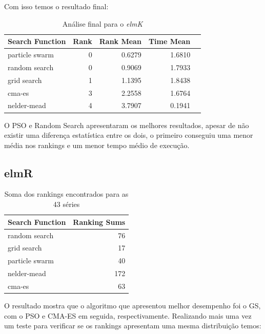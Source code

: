 \documentclass[preprint,12pt]{elsarticle}
\begin{document}
Com isso temos o resultado final:


\begin{table}[h]
	\centering
	\begin{tabular}{lrrrr}
		\hline
		Search Function   &   Rank &   Rank Mean &      Time Mean \\
		\hline
		particle swarm    &      0 &    0.6279 &       1.6810  \\
		random search     &      0 &    0.9069 &       1.7933  \\
		grid search       &      1 &    1.1395  &       1.8438  \\
		cma-es            &      3 &    2.2558  &      1.6764  \\
		nelder-mead       &      4 &    3.7907   &     0.1941 \\
		\hline
	\end{tabular}
	
	\caption{Análise final para o \textit{elmK}}
\end{table}

O PSO e Random Search apresentaram os melhores resultados, apesar de não existir uma diferença estatística entre os dois, o primeiro conseguiu uma menor média nos rankings e um menor tempo médio de execução.


\subsection{elmR}

\begin{table}[h]
	\centering
	\begin{tabular}{lr}
		\hline
		Search Function   &   Ranking Sums \\
		\hline
		random search     &             76 \\
		grid search       &             17 \\
		particle swarm    &             40 \\
		nelder-mead       &            172 \\
		cma-es            &             63 \\
		\hline
	\end{tabular}
	
	\caption{Soma dos rankings encontrados para as 43 séries}
\end{table}

O resultado mostra que o algoritmo que apresentou melhor desempenho foi o GS, com o PSO e CMA-ES em seguida, respectivamente. Realizando mais uma vez um teste para verificar se os rankings apresentam uma mesma distribuição temos:
\end{document}
